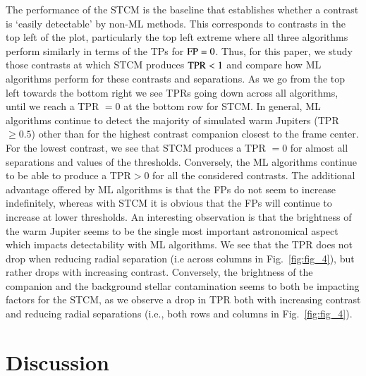 \documentclass{aa}
\begin{document}
The performance of the STCM is the baseline that establishes whether a contrast is `easily detectable' by non-ML methods. 
This corresponds to contrasts in the top left of the plot, particularly the top left extreme where all three algorithms perform similarly in terms of the TPs for ${\rm FP}=0$.
Thus, for this paper, we study those contrasts at which STCM produces ${\rm TPR}<1$ and compare how ML algorithms perform for these contrasts and separations.
As we go from the top left towards the bottom right we see TPRs going down across all algorithms, until we reach a TPR $=0$ at the bottom row for STCM. 
In general, ML algorithms continue to detect the majority of simulated warm Jupiters (TPR $\ge 0.5$) other than for the highest contrast companion closest to the frame center.
For the lowest contrast, we see that STCM produces a TPR $=0$ for almost all separations and values of the thresholds.
Conversely, the ML algorithms continue to be able to produce a TPR$>0$ for all the considered contrasts.
The additional advantage offered by ML algorithms is that the FPs do not seem to increase indefinitely, whereas with STCM it is obvious that the FPs will continue to increase at lower thresholds.
An interesting observation is that the brightness of the warm Jupiter seems to be the single most important astronomical aspect which impacts detectability with ML algorithms.
We see that the TPR does not drop when reducing radial separation (i.e across columns in Fig.~\ref{fig:fig_4}), but rather drops with increasing contrast. 
Conversely,  the brightness of the companion and the background stellar contamination seems to both be impacting factors for the STCM, as we observe a drop in TPR both with increasing contrast and reducing radial separations (i.e., both rows and columns in Fig.~\ref{fig:fig_4}).




\section{Discussion}
\label{sec:discussion}
\end{document}
